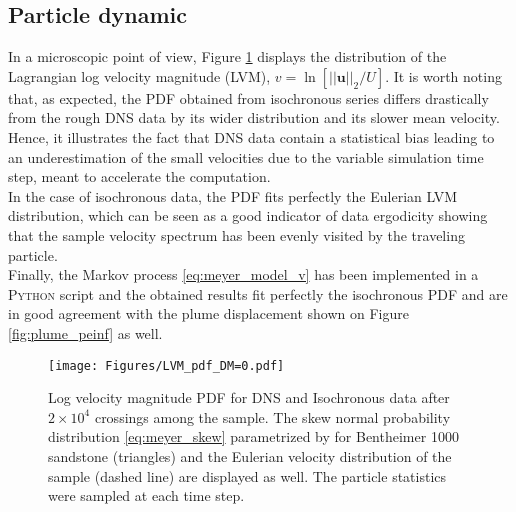 \subsection{Particle dynamic}
In a microscopic point of view, Figure \ref{fig:lvm_pdf_peinf} displays the distribution of the Lagrangian log velocity magnitude (LVM), $v = \ln[||\textbf{u}||_2/U]$. 
It is worth noting that, as expected, the PDF obtained from isochronous series differs drastically from the rough DNS data by its wider distribution and its slower mean velocity.
Hence, it illustrates the fact that DNS data contain a statistical bias leading to an underestimation of the small velocities due to the variable simulation time step, meant to accelerate the computation.\\
In the case of isochronous data, the PDF fits perfectly the Eulerian LVM distribution, which can be seen as a good indicator of data ergodicity showing that the sample velocity spectrum has been evenly visited by the traveling particle.\\
Finally, the Markov process \eqref{eq:meyer_model_v} has been implemented in a \textsc{Python} script and the obtained results fit perfectly the isochronous PDF and are in good agreement with the plume displacement shown on Figure \ref{fig:plume_peinf} as well.
\begin{figure}[h]
	\centering
	\texttt{[image: Figures/LVM\_pdf\_DM=0.pdf]}
	\caption{Log velocity magnitude PDF for DNS and Isochronous data after $2\times 10^4$ crossings among the sample. The skew normal probability distribution \eqref{eq:meyer_skew} parametrized by \citet{Meyer2016} for Bentheimer 1000 sandstone (triangles) and the Eulerian velocity distribution of the sample (dashed line) are displayed as well. The particle statistics were sampled at each time step.}
	\label{fig:lvm_pdf_peinf}
\end{figure}

